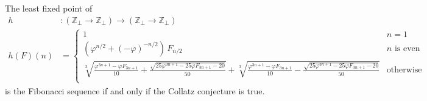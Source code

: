 \documentclass[12pt]{article}
\renewcommand{\phi}{\varphi}
\begin{document}
\noindent The least fixed point of 
\begin{align*}
    h & : (\mathbb{Z}_\bot \to \mathbb{Z}_\bot) \to (\mathbb{Z}_\bot \to \mathbb{Z}_\bot) \\
    h(F)(n) & = 
    \begin{cases}
        1 & n = 1 \\
        (\phi^{n/2} + (-\phi)^{-n/2})\, F_{n/2} & n \textrm{ is even} \\
        \sqrt[3]{\frac{\phi^{3n+1}-\phi F_{3n+1}}{10} + \frac{\sqrt{25 \phi^{3n+1} - 25\phi F_{3n+1} - 20}}{50}} + \sqrt[3]{\frac{\phi^{3n+1}-\phi F_{3n+1}}{10} - \frac{\sqrt{25 \phi^{3n+1} - 25\phi F_{3n+1} - 20}}{50}} & \textrm{otherwise} \\
    \end{cases}
\end{align*}
is the Fibonacci sequence if and only if the Collatz conjecture is true.
\end{document}
